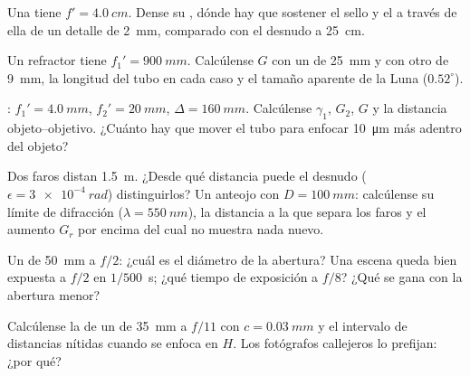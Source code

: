 \begin{exercise}[$\star$]\label{exo:b1:optical-instruments:3}
Una  tiene $f' = \qty{4.0}{cm}$. Dense su , dónde hay
que sostener el sello y el  a través de ella de un detalle
de \qty{2}{mm}, comparado con el  desnudo a \qty{25}{cm}.
\end{exercise}

\begin{exercise}[$\star$]\label{exo:b1:optical-instruments:4}
Un refractor tiene $f_1' = \qty{900}{mm}$. Calcúlense $G$ con un  de
\qty{25}{mm} y con otro de \qty{9}{mm}, la longitud del tubo en cada caso
y el tamaño aparente de la Luna ($0.52^\circ$).
\end{exercise}

\begin{exercise}[$\star\star$]\label{exo:b1:optical-instruments:5}
: $f_1' = \qty{4.0}{mm}$, $f_2' = \qty{20}{mm}$,
$\Delta = \qty{160}{mm}$. Calcúlense $\gamma_1$, $G_2$, $G$ y la distancia
objeto--objetivo. ¿Cuánto hay que mover el tubo para enfocar
\qty{10}{\micro m} más adentro del objeto?
\end{exercise}

\begin{exercise}[$\star\star$]\label{exo:b1:optical-instruments:6}
Dos faros distan \qty{1.5}{m}. ¿Desde qué distancia puede el  desnudo
($\epsilon = \qty{3e-4}{rad}$) distinguirlos? Un anteojo con
$D = \qty{100}{mm}$: calcúlense su límite de difracción ($\lambda =
\qty{550}{nm}$), la distancia a la que separa los faros y el aumento
$G_r$ por encima del cual no muestra nada nuevo.
\end{exercise}

\begin{exercise}[$\star\star$]\label{exo:b1:optical-instruments:7}
Un  de \qty{50}{mm} a $f/2$: ¿cuál es el diámetro de la abertura?
Una escena queda bien expuesta a $f/2$ en $1/500$~\unit{s}; ¿qué tiempo de
exposición a $f/8$? ¿Qué se gana con la abertura menor?
\end{exercise}

\begin{exercise}[$\star\star$]\label{exo:b1:optical-instruments:8}
Calcúlense la  de un  de \qty{35}{mm} a $f/11$
con $c = \qty{0.03}{mm}$ y el intervalo de distancias nítidas cuando se
enfoca en $H$. Los fotógrafos callejeros lo prefijan: ¿por qué?
\end{exercise}


